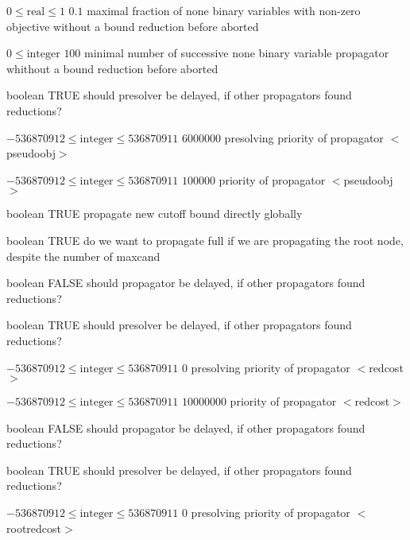 %
{$0\leq\textrm{real}\leq1$}%
{$0.1$}%
{maximal fraction of none binary variables with non-zero objective without a bound reduction before aborted}%
{}

%
{$0\leq\textrm{integer}$}%
{$100$}%
{minimal number of successive none binary variable propagator whithout a bound reduction before aborted}%
{}

%
{boolean}%
{TRUE}%
{should presolver be delayed, if other propagators found reductions?}%
{}

%
{$-536870912\leq\textrm{integer}\leq536870911$}%
{$6000000$}%
{presolving priority of propagator $<$pseudoobj$>$}%
{}

%
{$-536870912\leq\textrm{integer}\leq536870911$}%
{$100000$}%
{priority of propagator $<$pseudoobj$>$}%
{}

%
{boolean}%
{TRUE}%
{propagate new cutoff bound directly globally}%
{}

%
{boolean}%
{TRUE}%
{do we want to propagate full if we are propagating the root node, despite the number of maxcand}%
{}

%
{boolean}%
{FALSE}%
{should propagator be delayed, if other propagators found reductions?}%
{}

%
{boolean}%
{TRUE}%
{should presolver be delayed, if other propagators found reductions?}%
{}

%
{$-536870912\leq\textrm{integer}\leq536870911$}%
{$0$}%
{presolving priority of propagator $<$redcost$>$}%
{}

%
{$-536870912\leq\textrm{integer}\leq536870911$}%
{$10000000$}%
{priority of propagator $<$redcost$>$}%
{}

%
{boolean}%
{FALSE}%
{should propagator be delayed, if other propagators found reductions?}%
{}

%
{boolean}%
{TRUE}%
{should presolver be delayed, if other propagators found reductions?}%
{}

%
{$-536870912\leq\textrm{integer}\leq536870911$}%
{$0$}%
{presolving priority of propagator $<$rootredcost$>$}%
{}


